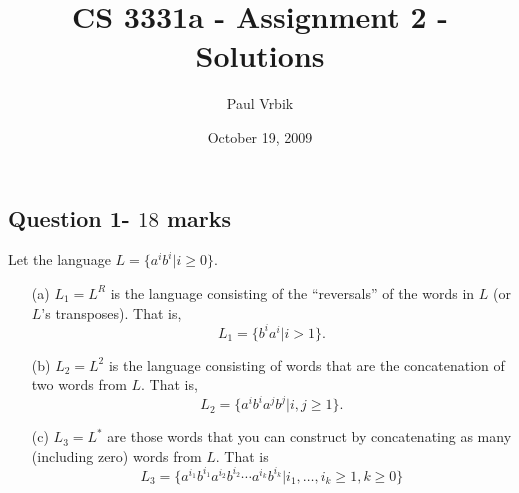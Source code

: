 \documentclass[12pt]{article}
\title{CS 3331a - Assignment 2 - Solutions}
\author{Paul Vrbik}
\date{October 19, 2009}
\begin{document}
 
\ShowFrame %

\maketitle
\subsection*{Question 1- $18$ marks}
Let the language $L = \{ a^ib^i | i \geq 0 \}$.
\begin{enumerate}
\item[(a)] $L_1 = L^R$ is the language consisting of the ``reversals'' of the words in $L$ (or $L$'s transposes). That is, 
$$L_1 = \{ b^ia^i | i> 1 \}.$$
\item[(b)] $L_2 = L^2$ is the language consisting of words that are the concatenation of two words from $L$. That is, 
$$L_2 = \{ a^ib^ia^jb^j | i,j \geq 1 \}.$$
\item[(c)] $L_3 = L^*$ are those words that you can construct by concatenating as many (including zero) words from $L$. That is
$$L_3 = \{ a^{i_1}b^{i_1}a^{i_2}b^{i_2}\cdots a^{i_k}b^{i_k}|i_1,\ldots ,i_k\geq 1,k\geq 0\}$$
\end{enumerate}
\end{document}
